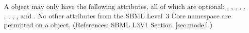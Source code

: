 A \Model object may only have the following attributes, all of which are
optional: , , , ,
, , ,
, ,  and
.  No other attributes from the SBML Level~3 Core
namespace are permitted on a \Model object.  (References: SBML L3V1
Section~\ref{sec:model}.)
